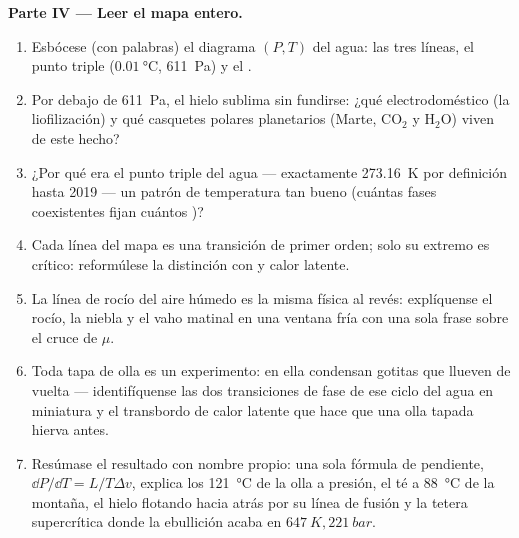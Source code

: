 \begin{problem}
\medskip\noindent\textbf{Parte IV --- Leer el mapa entero.}
\begin{enumerate}[resume]
  \item Esbócese (con palabras) el diagrama $(P, T)$ del agua: las tres
        líneas, el punto triple ($\qty{0.01}{\celsius}$,
        \qty{611}{Pa}) y el .
  \item Por debajo de \qty{611}{Pa}, el hielo sublima sin fundirse: ¿qué
        electrodoméstico (la liofilización) y qué casquetes polares
        planetarios (Marte, CO$_2$ y H$_2$O) viven de este hecho?
  \item ¿Por qué era el punto triple del agua --- exactamente
        \qty{273.16}{K} por definición hasta 2019 --- un patrón
        de temperatura tan bueno (cuántas fases coexistentes fijan cuántos
        )?
  \item Cada línea del mapa es una transición de primer orden; solo
        su extremo es crítico: reformúlese la distinción con
         y calor latente.
  \item La línea de rocío del aire húmedo es la misma física al revés:
        explíquense el rocío, la niebla y el vaho matinal en una ventana fría
        con una sola frase sobre el cruce de $\mu$.
  \item Toda tapa de olla es un experimento: en ella condensan gotitas
        que llueven de vuelta --- identifíquense las dos transiciones de fase
        de ese ciclo del agua en miniatura y el transbordo de calor latente
        que hace que una olla tapada hierva antes.
  \item Resúmase el resultado con nombre propio: una sola fórmula de pendiente, $\dd P/
        \dd T = L/T\Delta v$, explica los \qty{121}{\celsius} de la
        olla a presión, el té a \qty{88}{\celsius} de la montaña,
        el hielo flotando hacia atrás por su línea de fusión y la
        tetera supercrítica donde la ebullición acaba en
        $\qty{647}{K}, \qty{221}{bar}$.
\end{enumerate}
\end{problem}
